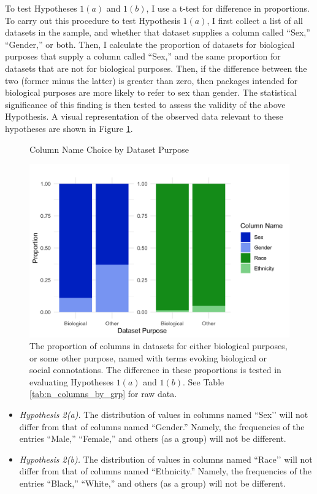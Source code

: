 To test Hypotheses $1(a)$ and $1(b)$, I use a t-test for difference in proportions. To carry out this procedure to test Hypothesis $1(a)$, I first collect a list of all datasets in the sample, and whether that dataset supplies a column called ``Sex,'' ``Gender,'' or both. Then, I calculate the proportion of datasets for biological purposes that supply a column called ``Sex,'' and the same proportion for datasets that are not for biological purposes. Then, if the difference between the two (former minus the latter) is greater than zero, then packages intended for biological purposes are more likely to refer to sex than gender. The statistical significance of this finding is then tested to assess the validity of the above Hypothesis. A visual representation of the observed data relevant to these hypotheses are shown in Figure \ref{fig:common_names}.

\begin{figure} [!htb]
    \caption{Column Name Choice by Dataset Purpose}
    \centering
    \includegraphics[width=.8\linewidth]{figures/common_names.png}
    \captionsetup{width=0.8\textwidth}
    \caption*{The proportion of columns in datasets for either biological purposes, or some other purpose, named with terms evoking biological or social connotations. The difference in these proportions is tested in evaluating Hypotheses $1(a)$ and $1(b)$. See Table \ref{tab:n_columns_by_grp} for raw data.}
    \label{fig:common_names}
\end{figure}

\begin{itemize}
  \item \textit{Hypothesis 2(a).} The distribution of values in columns named ``Sex’’ will not differ from that of columns named ``Gender.'' Namely, the frequencies of the entries ``Male,'' ``Female,'' and others (as a group) will not be different.
  \item \textit{Hypothesis 2(b).} The distribution of values in columns named ``Race’’ will not differ from that of columns named ``Ethnicity.'' Namely, the frequencies of the entries ``Black,'' ``White,'' and others (as a group) will not be different.
\end{itemize}

